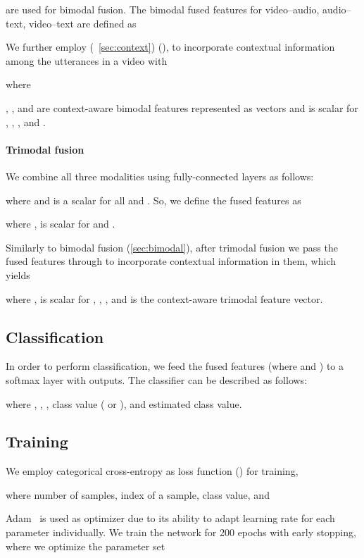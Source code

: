 \documentclass[review]{elsarticle}
\newcommand\?[1]{\hl{#1}}
\begin{document}
 are used for bimodal fusion. The bimodal
fused features for video--audio, audio--text, video--text are defined as


We further employ (~\cref{sec:context}) (), to
incorporate contextual information among the utterances in a video with

where

, , and  are context-aware bimodal features
represented as vectors and  is scalar for ,
, , and .

\paragraph{Trimodal fusion}
\label{sec:trimodal}

We combine all three modalities using fully-connected layers as follows:

where  and  is a scalar for all 
and .
So, we define the fused features as

where
,
 is scalar for  and .

Similarly to bimodal fusion (\cref{sec:bimodal}), after trimodal fusion we pass
the fused features through  to incorporate contextual information in
them, which yields

where ,  is scalar for , , ,
and  is the context-aware trimodal feature vector.

\subsection{Classification}
\label{sec:classification}

In order to perform classification, we feed the fused features  (where
 and ) to a softmax layer with 
outputs. The classifier can be described as follows:

where ,
, , 
class value ( or ), and  estimated class value.

\subsection{Training}
\label{training}
We employ categorical cross-entropy as loss function () for training,

where  number of samples,  index of a sample,  class value, and


  Adam~\citep{DBLP:journals/corr/KingmaB14} is used as optimizer due to its
  ability to adapt learning rate for each parameter individually. We train the
network for 200 epochs with early stopping, where we optimize the parameter set
\end{document}
